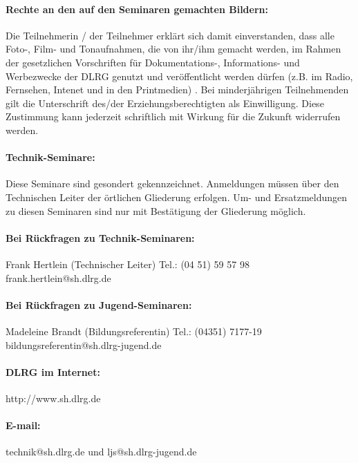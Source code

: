 \paragraph{Rechte an den auf den Seminaren gemachten Bildern:}
Die Teilnehmerin / der Teilnehmer erklärt sich damit einverstanden, dass alle Foto-, Film- und Tonaufnahmen, die von ihr/ihm gemacht werden, 
im Rahmen der gesetzlichen Vorschriften für Dokumentations-, Informations- und Werbezwecke der DLRG genutzt und veröffentlicht werden dürfen 
(z.B. im Radio, Fernsehen, Intenet und in den Printmedien) . Bei minderjährigen Teilnehmenden gilt die Unterschrift des/der Erziehungsberechtigten 
als Einwilligung. Diese Zustimmung kann jederzeit schriftlich mit Wirkung für die Zukunft widerrufen werden.

\paragraph{Technik-Seminare:}
Diese Seminare sind gesondert gekennzeichnet. Anmeldungen müssen über den Technischen Leiter der örtlichen Gliederung erfolgen. 
Um- und Ersatzmeldungen zu diesen Seminaren sind nur mit Bestätigung der Gliederung möglich.

\paragraph{Bei Rückfragen zu Technik-Seminaren:}\par
Frank Hertlein (Technischer Leiter)\newline
Tel.: (04 51) 59 57 98\newline
frank.hertlein@sh.dlrg.de

\paragraph{Bei Rückfragen zu Jugend-Seminaren:}\par
Madeleine Brandt (Bildungsreferentin)\newline
Tel.: (04351) 7177-19\newline
bildungsreferentin@sh.dlrg-jugend.de
\paragraph{DLRG im Internet:} http://www.sh.dlrg.de

\paragraph{E-mail:} technik@sh.dlrg.de und ljs@sh.dlrg-jugend.de


